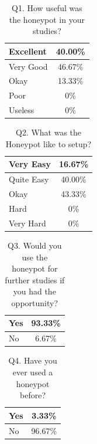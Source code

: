 \documentclass[10pt,journal]{IEEEtran}
\begin{document}
\begin{table}[ht]
  \centering
  \caption{Q1. How useful was the honeypot in your studies?}
  \label{tab:Useful}
  \begin{tabular}{|l|c|}
  \hline
  Excellent & 40.00\% \\ \hline
  Very Good & 46.67\% \\ \hline
  Okay      & 13.33\% \\ \hline
  Poor      & 0\%     \\ \hline
  Useless   & 0\%     \\ \hline
  \end{tabular}
\end{table}

\begin{table}[ht]
  \centering
  \caption{Q2. What was the Honeypot like to setup?}
  \label{tab:Setup}
  \begin{tabular}{|l|c|}
  \hline
  Very Easy  & 16.67\% \\ \hline
  Quite Easy & 40.00\% \\ \hline
  Okay       & 43.33\% \\ \hline
  Hard       & 0\%     \\ \hline
  Very Hard  & 0\%     \\ \hline
  \end{tabular}
\end{table}

\begin{table}[ht]
  \centering
  \caption{Q3. Would you use the honeypot for further studies if you had the opportunity?}
  \label{tab:UseAgain}
  \begin{tabular}{|l|c|}
  \hline
  Yes  & 93.33\% \\ \hline
  No   & 6.67\% \\ \hline
  \end{tabular}
\end{table}

\begin{table}[ht]
  \centering
  \caption{Q4. Have you ever used a honeypot before?}
  \label{tab:UsedBefore}
  \begin{tabular}{|l|c|}
  \hline
  Yes  & 3.33\% \\ \hline
  No   & 96.67\% \\ \hline
  \end{tabular}
\end{table}
\end{document}
